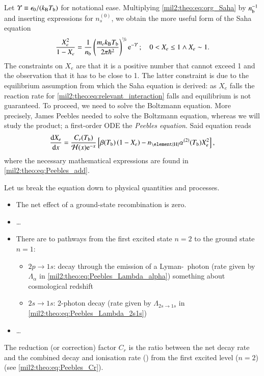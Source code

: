     Let $\varUpsilon\equiv \epsilon_0/(k_\mathrm{B} T_\mathrm{b} )$ for notational ease. Multiplying \cref{mil2:theo:eq:org_Saha} by $n_\mathrm{b}^{-1}$ and inserting expressions for $n_s^{(0)}$, we obtain the more useful form of the Saha equation
    \begin{equation}\label{mil2:theo:eq:Saha}
        \frac{X_e^2}{1-X_e}= \frac{1}{n_\mathrm{b}}\left(\frac{m_e k_\mathrm{B} T_\mathrm{b}}{2\pi \hbar^2} \right)^{\sfrac{3}{2}} \mathrm{e}^{-\varUpsilon}\,; \quad   0 < X_e \leq 1 \wedge X_e\sim 1.
    \end{equation}
    The constraints on $X_e$ are that it is a positive number that cannot exceed 1 and the observation that it has to be close to 1. The latter constraint is due to the equilibrium assumption from which the Saha equation is derived: as $X_e$ falls the reaction rate for \cref{mil2:theo:eq:relevant_interaction} falls and equilibrium is not guaranteed. To proceed, we need to solve the Boltzmann equation. More precisely, James Peebles needed to solve the Boltzmann equation, whereas we will study the product; a first-order ODE the \textit{Peebles equation}. Said equation reads
    \begin{equation}\label{mil2:theo:eq:Peebles}
        \dv{X_e}{x} = \frac{C_r(T\ped{b})}{\Hp(x)\eu^{-x}} \left[ \beta(T\ped{b}) \left(1-X_e\right) - n\ped{\element{H}} \alpha^{(2)}(T\ped{b})X_e^2 \right],
    \end{equation}
    where the necessary mathematical expressions are found in \cref{mil2:theo:eq:Peebles_add}.

    Let us break the equation down to physical quantities and processes. 
    \begin{itemize}
        \item The net effect of a ground-state recombination is zero.
        \item \dots
        \item There are to pathways from the first excited state $n=2$ to the ground state $n=1$: \begin{itemize}
            \item $2p\to 1s$: decay through the emission of a Lyman-\textalpha~photon (rate given by $\Lambda_\alpha$ in \cref{mil2:theo:eq:Peebles_Lambda_alpha}) something about cosmological redshift
            \item $2s\to 1s$: 2-photon decay (rate given by $\Lambda_{2s\to 1s}$ in \cref{mil2:theo:eq:Peebles_Lambda_2s1s})
        \end{itemize} 
        \item \dots
    \end{itemize}
    The reduction (or correction) factor $C_r$ is the ratio between the net decay rate and the combined decay and ionisation rate () from the first excited level ($n=2$) (see \cref{mil2:theo:eq:Peebles_Cr}).
    \citep{DodelsonBook,ChungPei1995,Peebles1968}

